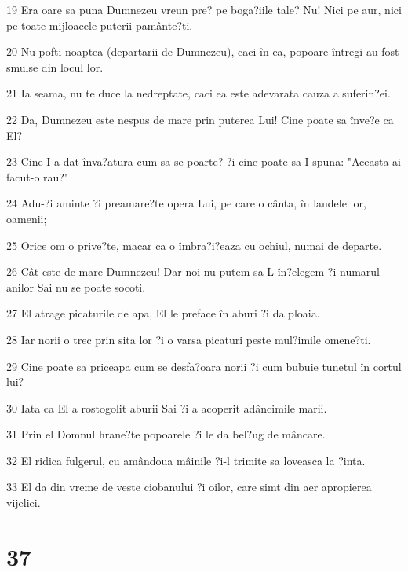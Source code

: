 \par 19 Era oare sa puna Dumnezeu vreun pre? pe boga?iile tale? Nu! Nici pe aur, nici pe toate mijloacele puterii pamânte?ti.
\par 20 Nu pofti noaptea (departarii de Dumnezeu), caci în ea, popoare întregi au fost smulse din locul lor.
\par 21 Ia seama, nu te duce la nedreptate, caci ea este adevarata cauza a suferin?ei.
\par 22 Da, Dumnezeu este nespus de mare prin puterea Lui! Cine poate sa înve?e ca El?
\par 23 Cine I-a dat înva?atura cum sa se poarte? ?i cine poate sa-I spuna: "Aceasta ai facut-o rau?"
\par 24 Adu-?i aminte ?i preamare?te opera Lui, pe care o cânta, în laudele lor, oamenii;
\par 25 Orice om o prive?te, macar ca o îmbra?i?eaza cu ochiul, numai de departe.
\par 26 Cât este de mare Dumnezeu! Dar noi nu putem sa-L în?elegem ?i numarul anilor Sai nu se poate socoti.
\par 27 El atrage picaturile de apa, El le preface în aburi ?i da ploaia.
\par 28 Iar norii o trec prin sita lor ?i o varsa picaturi peste mul?imile omene?ti.
\par 29 Cine poate sa priceapa cum se desfa?oara norii ?i cum bubuie tunetul în cortul lui?
\par 30 Iata ca El a rostogolit aburii Sai ?i a acoperit adâncimile marii.
\par 31 Prin el Domnul hrane?te popoarele ?i le da bel?ug de mâncare.
\par 32 El ridica fulgerul, cu amândoua mâinile ?i-l trimite sa loveasca la ?inta.
\par 33 El da din vreme de veste ciobanului ?i oilor, care simt din aer apropierea vijeliei.

\chapter{37}

